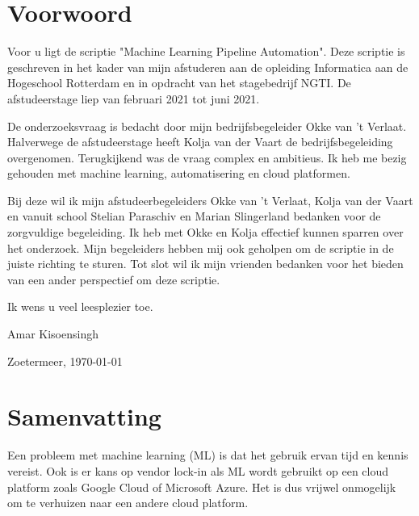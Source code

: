 \titleformat{\chapter}{\vspace{-1in}}{}{}{\Huge\textbf}
\section*{Voorwoord}\thispagestyle{fancy}
Voor u ligt de scriptie "Machine Learning Pipeline Automation". Deze scriptie is geschreven in het kader van mijn afstuderen aan de opleiding Informatica aan de Hogeschool Rotterdam en in opdracht van het stagebedrijf NGTI. De afstudeerstage liep van februari 2021 tot juni 2021.

De onderzoeksvraag is bedacht door mijn bedrijfsbegeleider Okke van 't Verlaat. Halverwege de afstudeerstage heeft Kolja van der Vaart de bedrijfsbegeleiding overgenomen. Terugkijkend was de vraag complex en ambitieus. Ik heb me bezig gehouden met machine learning, automatisering en cloud platformen. 

Bij deze wil ik mijn afstudeerbegeleiders Okke van 't Verlaat, Kolja van der Vaart en vanuit school Stelian Paraschiv en Marian Slingerland bedanken voor de zorgvuldige begeleiding. Ik heb met Okke en Kolja effectief kunnen sparren over het onderzoek. Mijn begeleiders hebben mij ook geholpen om de scriptie in de juiste richting te sturen. Tot slot wil ik mijn vrienden bedanken voor het bieden van een ander perspectief om deze scriptie.

Ik wens u veel leesplezier toe.

Amar Kisoensingh

Zoetermeer, \today

\newpage

\section*{Samenvatting}
Een probleem met machine learning (ML) is dat het gebruik ervan tijd en kennis vereist. Ook is er kans op vendor lock-in als ML wordt gebruikt op een cloud platform zoals Google Cloud of Microsoft Azure. Het is dus vrijwel onmogelijk om te verhuizen naar een andere cloud platform.

